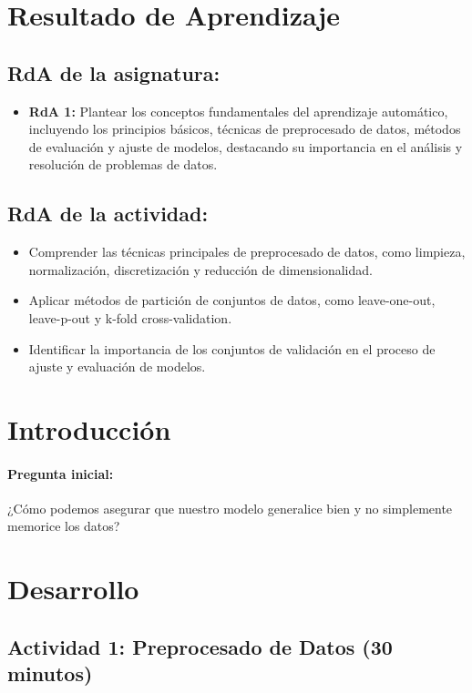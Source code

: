 \documentclass[a4,11pt]{aleph-notas}
\begin{document}
\encabezado


\section*{Resultado de Aprendizaje}

\subsection*{RdA de la asignatura:}
\begin{itemize}
    \item \textbf{RdA 1:} 
    Plantear los conceptos fundamentales del aprendizaje automático, incluyendo los principios básicos, técnicas de preprocesado de datos, métodos de evaluación y ajuste de modelos, destacando su importancia en el análisis y resolución de problemas de datos.
\end{itemize}

\subsection*{RdA de la actividad:}
\begin{itemize}
    \item Comprender las técnicas principales de preprocesado de datos, como limpieza, normalización, discretización y reducción de dimensionalidad.
    \item Aplicar métodos de partición de conjuntos de datos, como leave-one-out, leave-p-out y k-fold cross-validation.
    \item Identificar la importancia de los conjuntos de validación en el proceso de ajuste y evaluación de modelos.
\end{itemize}

\section*{Introducción}

\paragraph{Pregunta inicial:} 
¿Cómo podemos asegurar que nuestro modelo generalice bien y no simplemente memorice los datos?


\section*{Desarrollo}

\subsection*{Actividad 1: Preprocesado de Datos (30 minutos)}  
\end{document}
